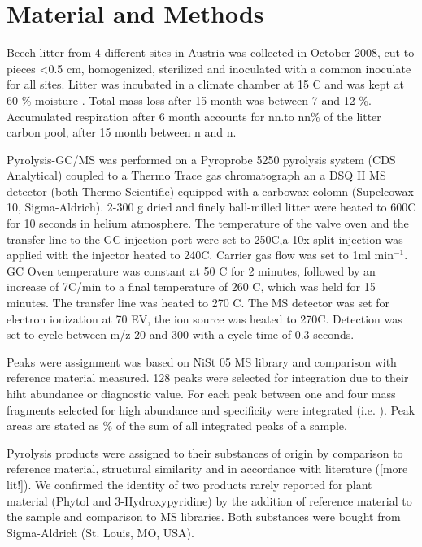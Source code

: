 \documentclass[preprint,review,12pt]{elsarticle}
\begin{document}
\section{Material and Methods}

Beech litter from 4 different sites in Austria was collected in October 2008, cut to pieces \textless 0.5 cm, homogenized, sterilized and inoculated with a common inoculate for all sites. Litter was incubated in a climate chamber at 15 \textdegree C and was kept at 60 \% moisture \citep{Wanek2010}. Total mass loss after 15 month was between 7 and 12 \%. Accumulated respiration after 6 month accounts for nn.to nn\% of the litter carbon pool, after 15 month between n and n.

Pyrolysis-GC/MS was performed on a Pyroprobe 5250 pyrolysis system (CDS Analytical) coupled to a Thermo Trace gas chromatograph an a DSQ II MS detector (both Thermo Scientific) equipped with a carbowax colomn (Supelcowax 10, Sigma-Aldrich). 2-300 \textmu g dried and finely ball-milled litter were heated to 600\textdegree C for 10 seconds in helium atmosphere. The temperature of the valve oven and the transfer line to the GC injection port were set to 250\textdegree C,a 10x split injection was applied with the injector heated to 240\textdegree C. Carrier gas flow was set to 1ml min$^{-1}$. GC Oven temperature was constant at 50 \textdegree C for 2 minutes, followed by an increase of 7\textdegree C/min to a final temperature of 260 \textdegree C, which was held for 15 minutes. The transfer line was heated to 270 \textdegree C. The MS detector was set for electron ionization at 70 EV, the ion source was heated to 270\textdegree C. Detection was set to cycle between m/z 20 and 300 with a cycle time of 0.3 seconds.


Peaks were assignment was based on NiSt 05 MS library and comparison with reference material measured.  128 peaks were selected for integration due to their hiht abundance or diagnostic value. For each peak between one and four mass fragments selected for high abundance and specificity were integrated (i.e. \cite{Schellekens2009}). Peak areas are stated as \% of the sum of all integrated peaks of a sample. 

Pyrolysis products were assigned to their substances of origin by comparison to reference material, structural similarity and in accordance with literature (\cite{Ralph1991a, Schellekens2009, Chiavari1992}[more lit!]). We confirmed the identity of two products rarely reported for plant material (Phytol and 3-Hydroxypyridine) by the addition of reference material to the sample and comparison to MS libraries. Both substances were bought from Sigma-Aldrich (St. Louis, MO, USA).
\end{document}
